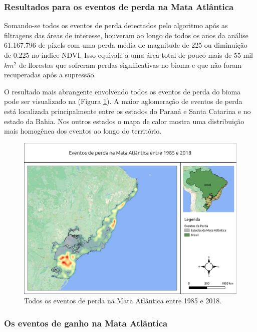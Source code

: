 \subsubsection{Resultados para os eventos de perda na Mata Atlântica}

\hspace{13pt} Somando-se todos os eventos de perda detectados pelo algoritmo após as filtragens das áreas de interesse, houveram ao longo de todos os anos da análise 61.167.796 de pixels com uma perda média de magnitude de 225 ou diminuição de 0.225 no índice NDVI. Isso equivale a uma área total de pouco mais de 55 mil $ km^2 $ de florestas que sofreram perdas significativas no bioma e que não foram recuperadas após a supressão.

O resultado mais abrangente envolvendo todos os eventos de perda do bioma pode ser visualizado na (Figura \ref{fig:heat_loss_masked85_maskedgain}). A maior aglomeração de eventos de perda está localizada principalmente entre os estados do Paraná e Santa Catarina e no estado da Bahia. Nos outros estados o mapa de calor mostra uma distribuição mais homogênea dos eventos ao longo do território. 

\begin{figure}[H]
    \centering
    \includegraphics[scale=.5]{images/heatmap_loss_masked85_maskedgain.pdf}
    \caption{Todos os eventos de perda na Mata Atlântica entre 1985 e 2018.}
    \label{fig:heat_loss_masked85_maskedgain}
\end{figure}

\subsubsection{Os eventos de ganho na Mata Atlântica}

